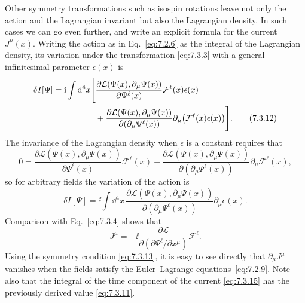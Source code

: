 Other symmetry transformations such as isospin rotations leave not only the
action and the Lagrangian invariant but also the Lagrangian density. In such
cases we can go even further, and write an explicit formula for the current
$J^\mu(x)$. Writing the action as in Eq.~\eqref{eq:7.2.6} as the integral of the
Lagrangian density, its variation under the transformation \eqref{eq:7.3.3} with a
general infinitesimal parameter $\epsilon(x)$ is
\begin{align}
\delta I[\Psi]=\mathrm{i}\int \mathop{}\!\mathrm{d}^4x\Bigg[&
\frac{\partial\mathcal{L}(\Psi(x),\partial_\mu\Psi(x))}
{\partial\Psi^\ell(x)}\mathcal{F}^\ell(x)\epsilon(x)\notag\\
&+\frac{\partial\mathcal{L}(\Psi(x),\partial_\mu\Psi(x))}
{\partial(\partial_\mu\Psi^\ell(x))}
\partial_\mu\bigl(\mathcal{F}^\ell(x)\epsilon(x)\bigr)\Bigg].
\tag{7.3.12}\label{eq:7.3.12}
\end{align}
The invariance of the Lagrangian density when $\epsilon$ is a constant requires
that
\begin{equation}
0=\frac{\partial\mathcal{L}(\Psi(x),\partial_\mu\Psi(x))}
{\partial\Psi^\ell(x)}\mathcal{F}^\ell(x)
+\frac{\partial\mathcal{L}(\Psi(x),\partial_\mu\Psi(x))}
{\partial(\partial_\mu\Psi^\ell(x))}\partial_\mu\mathcal{F}^\ell(x),
\tag{7.3.13}\label{eq:7.3.13}
\end{equation}
so for arbitrary fields the variation of the action is
\begin{equation}
\delta I[\Psi]=\ii\int \dd^4x\,
\frac{\partial\mathcal{L}(\Psi(x),\partial_\mu\Psi(x))}
{\partial(\partial_\mu\Psi^\ell(x))}
\partial_\mu\epsilon(x).
\tag{7.3.14}\label{eq:7.3.14}
\end{equation}
Comparison with Eq.~\eqref{eq:7.3.4} shows that
\begin{equation}
J^\mu=-\ii\frac{\partial\mathcal{L}}
{\partial(\partial\Psi^\ell/\partial x^\mu)}\mathcal{F}^\ell.
\tag{7.3.15}\label{eq:7.3.15}
\end{equation}
Using the symmetry condition \eqref{eq:7.3.13}, it is easy to see directly that
$\partial_\mu J^\mu$ vanishes when the fields satisfy the Euler--Lagrange
equations~\eqref{eq:7.2.9}. Note also that the integral of the time component of the
current \eqref{eq:7.3.15} has the previously derived value \eqref{eq:7.3.11}.

